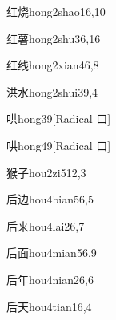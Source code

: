 \begin{entry}{红烧}{hong2shao1}{6,10}
\end{entry}

\begin{entry}{红薯}{hong2shu3}{6,16}
\end{entry}

\begin{entry}{红线}{hong2xian4}{6,8}
\end{entry}

\begin{entry}{洪水}{hong2shui3}{9,4}
\end{entry}

\begin{entry}{哄}{hong3}{9}[Radical 口]
\end{entry}

\begin{entry}{哄}{hong4}{9}[Radical 口]
\end{entry}

\begin{entry}{猴子}{hou2zi5}{12,3}
\end{entry}

\begin{entry}{后边}{hou4bian5}{6,5}
\end{entry}

\begin{entry}{后来}{hou4lai2}{6,7}
\end{entry}

\begin{entry}{后面}{hou4mian5}{6,9}
\end{entry}

\begin{entry}{后年}{hou4nian2}{6,6}
\end{entry}

\begin{entry}{后天}{hou4tian1}{6,4}
\end{entry}

